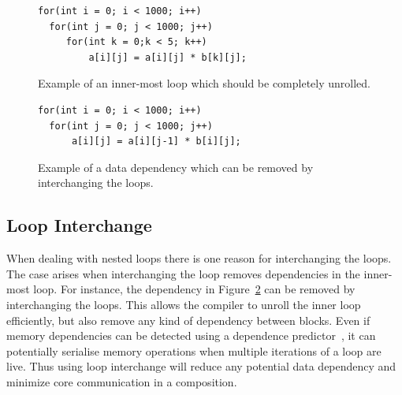 \begin{figure}[t]
\lstset{language=C,numbersep=4pt}
\begin{center}
\begin{lstlisting}
for(int i = 0; i < 1000; i++)
  for(int j = 0; j < 1000; j++)
     for(int k = 0;k < 5; k++)
         a[i][j] = a[i][j] * b[k][j];
\end{lstlisting}
\end{center}
\vspace{-1em}
\caption{Example of an inner-most loop which should be completely unrolled.}
\label{lst:small}
\vspace{1em}
\end{figure}

\begin{figure}[t]
\lstset{language=C,numbersep=4pt}
\begin{center}
\begin{lstlisting}
for(int i = 0; i < 1000; i++)
  for(int j = 0; j < 1000; j++)
      a[i][j] = a[i][j-1] * b[i][j];
\end{lstlisting}
\end{center}
\vspace{-1em}
\caption{Example of a data dependency which can be removed by interchanging the loops.}
\label{lst:dep}
\vspace{1em}
\end{figure}


\subsection{Loop Interchange}
When dealing with nested loops there is one reason for interchanging the loops.
The case arises when interchanging the loop removes dependencies in the inner-most loop.
For instance, the dependency in Figure~\ref{lst:dep} can be removed by interchanging the loops. 
This allows the compiler to unroll the inner loop efficiently, but also remove any kind of dependency between blocks.
Even if memory dependencies can be detected using a dependence predictor~\cite{chrysos1998storesets}, it can potentially serialise memory operations when multiple iterations of a loop are live.
Thus using loop interchange will reduce any potential data dependency and minimize core communication in a composition.

